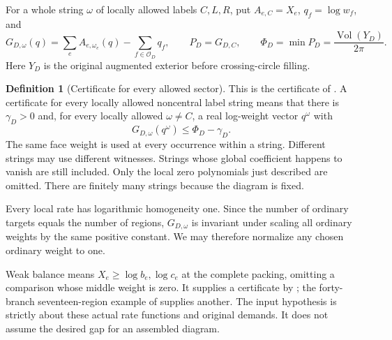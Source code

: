 \documentclass[11pt]{article}
\numberwithin{equation}{section}
\theoremstyle{definition}\newtheorem{definition}[theorem]{Definition}
\theoremstyle{remark}\newtheorem{remark}[theorem]{Remark}
\begin{document}
For a whole string \(\omega\) of locally allowed labels \(C,L,R\), put \(A_{e,C}=X_e\), \(q_f=\log w_f\), and
\begin{equation}\label{ti:eq-C2a}
G_{D,\omega}(q)=\sum_e A_{e,\omega_e}(q)-\sum_{f\in\mathcal O_D}q_f,
\qquad P_D=G_{D,C},\qquad
\Phi_D=\min P_D=\frac{\operatorname{Vol}(Y_D)}{2\pi}.
\end{equation}
Here \(Y_D\) is the original augmented exterior before crossing-circle filling.
\begin{definition}[Certificate for every allowed sector]\label{ti:certificate}
This is the certificate of \cite[Definition 3.1]{Planar}. A certificate for every locally allowed noncentral label string means that there is \(\gamma_D>0\) and, for every locally allowed \(\omega\ne C\), a real log-weight vector \(q^\omega\) with
\begin{equation}\label{ti:eq-C2}
G_{D,\omega}(q^\omega)\le\Phi_D-\gamma_D.
\end{equation}
The same face weight is used at every occurrence within a string. Different strings may use different witnesses. Strings whose global coefficient happens to vanish are still included. Only the local zero polynomials just described are omitted. There are finitely many strings because the diagram is fixed.
\end{definition}
Every local rate has logarithmic homogeneity one. Since the number
of ordinary targets equals the number of regions, \(G_{D,\omega}\)
is invariant under scaling all ordinary weights by the same positive
constant. We may therefore normalize any chosen ordinary weight to one.

Weak balance means \(X_e\ge\log b_e,\log c_e\) at the complete
packing, omitting a comparison whose middle weight is zero. It supplies
a certificate by \cite[Theorem~4.3]{Planar}; the
forty-branch seventeen-region example of \cite[Theorem~6.1]{Planar}
supplies another. The input hypothesis is strictly about these actual rate functions and original demands. It does not assume the desired gap for an assembled diagram.
\end{document}
